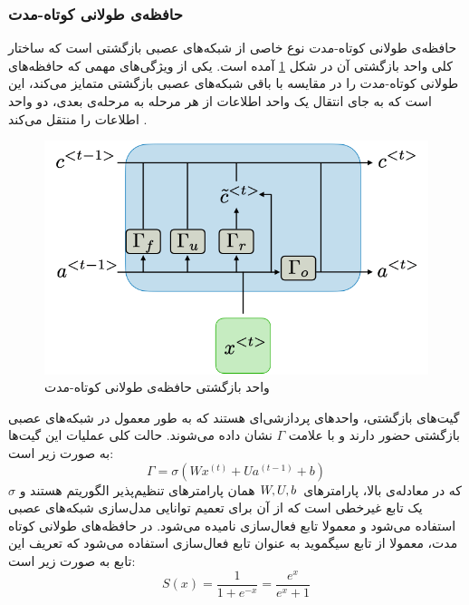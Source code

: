 \subsubsection{حافظه‌ی طولانی کوتاه-مدت}
حافظه‌ی طولانی کوتاه-مدت
نوع خاصی از شبکه‌های عصبی بازگشتی است که ساختار کلی  واحد بازگشتی آن در شکل
\ref{fig:lstmblock}
آمده است.
یکی از ویژگی‌های مهمی که حافظه‌های طولانی کوتاه-مدت را در مقایسه با باقی شبکه‌های عصبی بازگشتی متمایز می‌کند، این است که به جای انتقال یک واحد اطلاعات از هر مرحله به مرحله‌ی بعدی، دو واحد اطلاعات را منتقل می‌کند
\cite{lstm_paper}
.

\begin{figure}
	\centering
	\includegraphics[scale=0.4]{figures/lstm-rec-unit.png}
	\caption [
	واحد بازگشتی حافظه‌ی طولانی کوتاه-مدت
	]{
	واحد بازگشتی حافظه‌ی طولانی کوتاه-مدت 
	\cite{rnncheat}
	}
	\label{fig:lstmblock}
\end{figure}

گیت‌های بازگشتی، واحدهای پردازشی‌ای هستند که به طور معمول در شبکه‌های عصبی بازگشتی حضور دارند و با علامت 
$\Gamma$
نشان داده می‌شوند. حالت کلی عملیات این گیت‌ها به صورت زیر است:
\begin{equation}
    \Gamma = \sigma(Wx^{(t)} + Ua^{(t-1)} + b)
\end{equation}
\hsm
که در معادله‌ی بالا، پارامترهای
$W, U, b \hspace{0.5mm}$
همان پارامترهای تنظیم‌پذیر الگوریتم هستند و
$\sigma$
یک تابع غیرخطی است که از آن برای تعمیم توانایی مدل‌سازی شبکه‌های عصبی استفاده می‌شود و معمولا تابع فعال‌سازی
نامیده می‌شود.
در حافظه‌های طولانی کوتاه مدت، معمولا از تابع سیگموید
به عنوان تابع فعال‌سازی استفاده می‌شود که تعریف این تابع به صورت زیر است:
\begin{equation}
    S(x) = \frac{1}{1+e^{-x}} = \frac{e^x}{e^x + 1}
\end{equation}


